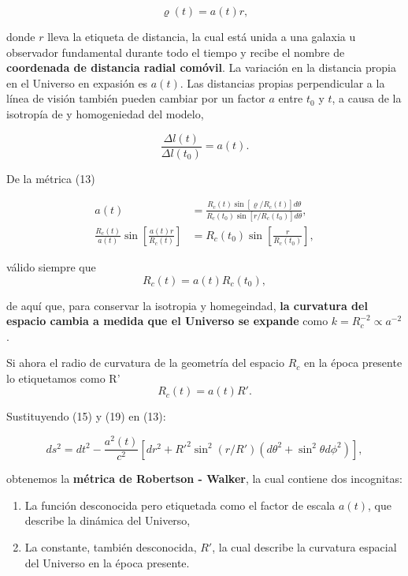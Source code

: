 \documentclass{article}
\begin{document}
    \begin{equation}
        \varrho (t) = a(t)r,
    \end{equation}

donde $r$ lleva la etiqueta de distancia, la cual está unida a una galaxia u observador fundamental durante todo el tiempo y recibe el nombre de {\bf{coordenada de distancia radial comóvil}}. La variación en la distancia propia en el Universo en expasión es $a(t)$. Las distancias propias perpendicular a la línea de visión también pueden cambiar por un factor $a$ entre $t_0$ y $t$, a causa de la isotropía de y homogeniedad del modelo, 

\begin{equation}
    \frac{\Delta l(t)}{\Delta l(t_0)} = a(t).
\end{equation}

De la métrica (13) 

    \begin{align}
        a(t) & = \frac{R_c(t) \sin[\varrho/R_c(t)] d \theta}{R_c(t_0) \sin[r/R_c(t_0)] d \theta}, \\
    \frac{R_c(t)}{a(t)} \sin \left[\frac{a(t)r}{R_c(t)} \right] & = R_c(t_0) \sin \left[\frac{r}        {R_c(t_0)} \right],
    \end{align}

válido siempre que 
    \begin{equation}
        R_c (t) = a(t) R_c (t_0),
    \end{equation} 

de aquí que, para conservar la isotropia y homegeindad, {\bf{la curvatura del espacio cambia a medida que el Universo se expande}} como $k = R_c^{-2} \propto a^{-2}$. 

Si ahora el radio de curvatura de la geometría del espacio $R_c$ en la época presente lo etiquetamos como R'
    \begin{equation}
        R_c (t) = a(t) R'.
    \end{equation}

Sustituyendo (15) y (19) en (13):

    \begin{equation}
        ds^2 = dt^2 - \frac{a^2(t)}{c^2} [dr^2 + R'^2 \sin^2(r/R')(d \theta^2 + \sin^2 \theta d\phi^2)],
    \end{equation}

obtenemos la {\bf{métrica de Robertson - Walker}}, la cual contiene dos incognitas: 

    \begin{enumerate}
        \item La función desconocida pero etiquetada como el factor de escala $a(t)$, que describe la dinámica del Universo,
        \item La constante, también desconocida, $R'$, la cual describe la curvatura espacial del Universo en la época presente. 
    \end{enumerate} 
\end{document}
